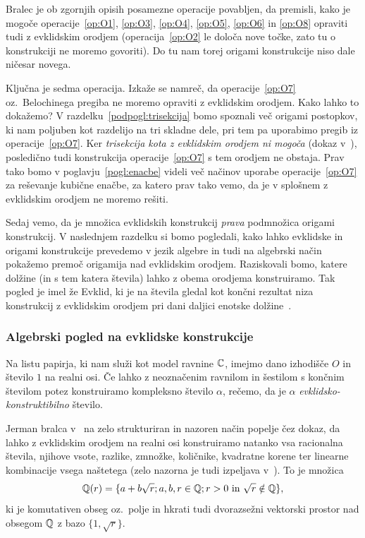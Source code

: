Bralec je ob zgornjih opisih posamezne operacije povabljen, da premisli, kako je mogoče operacije~\ref{op:O1}, \ref{op:O3}, \ref{op:O4}, \ref{op:O5}, \ref{op:O6} in \ref{op:O8} opraviti tudi z evklidskim orodjem (operacija~\ref{op:O2} le določa nove točke, zato tu o konstrukciji ne moremo govoriti). Do tu nam torej origami konstrukcije niso dale ničesar novega.

Ključna je sedma operacija. Izkaže se namreč, da operacije~\ref{op:O7} oz.\ Belochinega pregiba ne moremo opraviti z evklidskim orodjem. Kako lahko to dokažemo? V razdelku~\ref{podpogl:trisekcija} bomo spoznali več origami postopkov, ki nam poljuben kot razdelijo na tri skladne dele, pri tem pa uporabimo pregib iz operacije~\ref{op:O7}. Ker \emph{trisekcija kota z evklidskim orodjem ni mogoča} (dokaz v~\cite[str.\ 77--78]{jerman1998}), posledično tudi konstrukcija operacije~\ref{op:O7} s tem orodjem ne obstaja. Prav tako bomo v poglavju~\ref{pogl:enacbe} videli več načinov uporabe operacije~\ref{op:O7} za reševanje kubične enačbe, za katero prav tako vemo, da je v splošnem z evklidskim orodjem ne moremo rešiti.

Sedaj vemo, da je množica evklidskih konstrukcij \emph{prava} podmnožica origami konstrukcij. V naslednjem razdelku si bomo pogledali, kako lahko evklidske in origami konstrukcije prevedemo v jezik algebre in tudi na algebrski način pokažemo premoč origamija nad evklidskim orodjem. Raziskovali bomo, katere dolžine (in s tem katera števila) lahko z obema orodjema konstruiramo. Tak pogled je imel že Evklid, ki je na števila gledal kot končni rezultat niza konstrukcij z evklidskim orodjem pri dani daljici enotske dolžine~\cite[str. 164]{michael2005}.

\subsubsection{Algebrski pogled na evklidske konstrukcije}
\label{podpogl:evkl_konstruktibilnost}

\begin{definicija}
    Na listu papirja, ki nam služi kot model ravnine $\mathbb C$, imejmo dano izhodišče $O$ in število $1$ na realni osi. Če lahko z neoznačenim ravnilom in šestilom s končnim številom potez konstruiramo kompleksno število $\alpha$, rečemo, da je $\alpha$ \emph{evklidsko-konstruktibilno} število.
\end{definicija}

Jerman bralca v~\cite{jerman1998} na zelo strukturiran in nazoren način popelje čez dokaz, da lahko z evklidskim orodjem na realni osi konstruiramo natanko vsa racionalna števila, njihove vsote, razlike, zmnožke, količnike, kvadratne korene ter linearne kombinacije vsega naštetega (zelo nazorna je tudi izpeljava v~\cite[str.165--170]{michael2005}). To je množica
$$
    \mathbb Q(r) = \{ a + b \sqrt{r}; a, b, r \in \mathbb Q; r > 0 \text{ in } \sqrt{r} \notin \mathbb Q \},
$$
ki je komutativen obseg oz.\ polje in hkrati tudi dvorazsežni vektorski prostor nad obsegom $\mathbb Q$ z bazo $ \{1, \sqrt{r} \} $.

